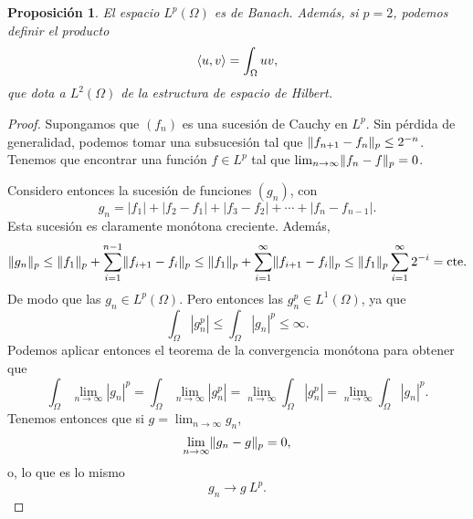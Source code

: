 \documentclass[12pt,a4paper]{book}
\DeclarePairedDelimiter\norm{\lVert}{\rVert}
\DeclarePairedDelimiter\esc{\langle}{\rangle}
\newtheorem{prop}[thm]{Proposición}
\theoremstyle{definition} \newtheorem{defn}[thm]{Definición}
\theoremstyle{definition} \newtheorem{ejemplo}[thm]{Ejemplo}
\theoremstyle{definition} \newtheorem{ejercicio}[thm]{Ejercicio}
\theoremstyle{remark} \newtheorem*{obs}{Observación}
\newcommand{\cte}{\mathrm{cte.}}
\begin{document}
\begin{prop}
  El espacio $L^p(\Omega)$ es de Banach. Además, si $p=2$, podemos definir el producto
  \begin{equation*}
    \esc{u,v}=\int_{\Omega}uv,
  \end{equation*}
  que dota a $L^2(\Omega)$ de la estructura de espacio de Hilbert.
\end{prop}
\begin{proof}
  Supongamos que $(f_n)$ es una sucesión de Cauchy en $L^p$. Sin pérdida de generalidad, podemos tomar una subsucesión tal que $\norm{f_{n+1}-f_n}_p\leq 2^{-n}$. Tenemos que encontrar una función $f\in L^p$ tal que $\lim_{n\rightarrow \infty} \norm{f_n-f}_p=0$. 

  Considero entonces la sucesión de funciones $(g_n)$, con
  \begin{equation*}
    g_n = |f_1|+|f_2-f_1|+|f_3-f_2|+\cdots+ |f_n-f_{n-1}|.
  \end{equation*}
  Esta sucesión es claramente monótona creciente. Además,
  \begin{equation*}
    \norm{g_n}_p\leq \norm{f_1}_p + \sum_{i=1}^{n-1}\norm{f_{i+1}-f_i}_p \leq \norm{f_1}_p + \sum_{i=1}^{\infty}\norm{f_{i+1}-f_i}_p \leq \norm{f_1}_p \sum_{i=1}^{\infty}2^{-i}= \cte
  \end{equation*}
  De modo que las $g_n \in L^p(\Omega)$. Pero entonces las $g_n^p \in L^1(\Omega)$, ya que 
 \begin{equation*}
 \int_\Omega |g_n^p| \leq \int_\Omega |g_n|^p \leq \infty.   
  \end{equation*}
  Podemos aplicar entonces el teorema de la convergencia monótona para obtener que
  \begin{equation*}
    \int_{\Omega} \lim_{n\rightarrow \infty} |g_n|^p=\int_{\Omega} \lim_{n\rightarrow \infty} |g_n^p| = \lim_{n\rightarrow \infty} \int_{\Omega} |g_n^p|= \lim_{n\rightarrow \infty} \int_{\Omega} |g_n|^p.
  \end{equation*}
  Tenemos entonces que si $g=\lim_{n\rightarrow \infty}g_n$, 
  \begin{equation*}
    \lim_{n\rightarrow \infty} \norm{g_n-g}_p = 0,
  \end{equation*}
o, lo que es lo mismo
\begin{equation*}
  g_n \rightarrow g \ L^p.
\end{equation*}


\end{proof}
\end{document}
